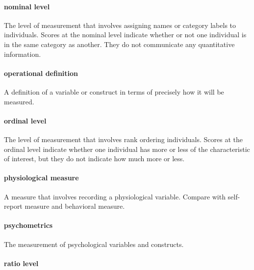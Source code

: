 \documentclass[
]{krantz}
\begin{document}
\paragraph*{nominal level}\label{nominal-level}

The level of measurement that involves assigning names or category labels to individuals. Scores at the nominal level indicate whether or not one individual is in the same category as another. They do not communicate any quantitative information.

\paragraph*{operational definition}\label{operational-definition-1}

A definition of a variable or construct in terms of precisely how it will be measured.

\paragraph*{ordinal level}\label{ordinal-level}

The level of measurement that involves rank ordering individuals. Scores at the ordinal level indicate whether one individual has more or less of the characteristic of interest, but they do not indicate how much more or less.

\paragraph*{physiological measure}\label{physiological-measure}

A measure that involves recording a physiological variable. Compare with self-report measure and behavioral measure.

\paragraph*{psychometrics}\label{psychometrics}

The measurement of psychological variables and constructs.

\paragraph*{ratio level}\label{ratio-level}
\end{document}
